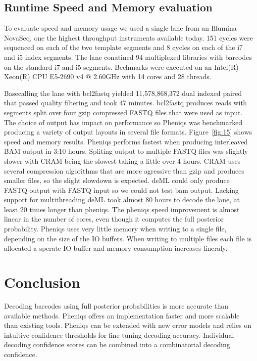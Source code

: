 \documentclass[10pt,twocolumn]{article}
\begin{document}
\subsection*{Runtime Speed and Memory evaluation}

To evaluate speed and memory usage we used a single lane from an Illumina NovaSeq, one the highest throughput instruments available today. 151 cycles were sequenced on each of the two template segments and 8 cycles on each of the i7 and i5 index segments. The lane conatined 94 multiplexed libraries with barcodes on the standard i7 and i5 segments. Bechmarks were executed on an Intel(R) Xeon(R) CPU E5-2690 v4 @ 2.60GHz with 14 cores and 28 threads.

Basecalling the lane with bcl2fastq yielded 11,578,868,372 dual indexed paired that passed quality filtering and took 47 minutes. bcl2fastq produces reads with segments split over four gzip compressed FASTQ files that were used as input. The choice of output has impact on performance so Pheniqs was benchmarked producing a variety of output layouts in several file formats. Figure~\ref{fig:15} shows speed and memory results. Pheniqs performs fastest when producing interleaved BAM output in 3:10 hours. Spliting output to multiple FASTQ files was slightly slower with CRAM being the slowest taking a little over 4 hours. CRAM uses several compression algorithms that are more agressive than gzip and produces smaller files, so the slight slowdown is expected. deML could only produce FASTQ output with FASTQ input so we could not test bam output. Lacking support for multithreading deML took almost 80 hours to decode the lane, at least 20 times longer than pheniqs. The pheniqs speed improvement is almost linear in the number of cores, even though it computes the full posterior probability. Pheniqs uses very little memory when writing to a single file, depending on the size of the IO buffers. When writing to multiple files each file is allocated a sperate IO buffer and memory consumption increases lineraly.

\section*{Conclusion}
Decoding barcodes using full posterior probabilities is more accurate than available methods. Pheniqs offers an implementation faster and more scalable than existing tools. Pheniqs can be extended with new error models and relies on intuitive confidence thresholds for fine-tuning decoding accuracy. Individual decoding confidence scores can be combined into a combinatorial decoding confidence.
\end{document}
